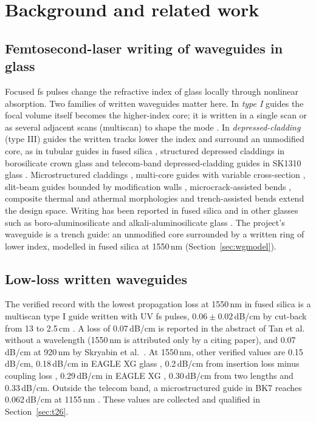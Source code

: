 \documentclass[11pt,a4paper]{article}
\newcommand{\dBcm}{\,dB/cm\xspace}
\begin{document}
\section{Background and related work}
\label{sec:background}

\subsection{Femtosecond-laser writing of waveguides in glass}

Focused fs pulses change the refractive index of glass locally through nonlinear absorption. Two families of written waveguides matter here. In \emph{type I} guides the focal volume itself becomes the higher-index core; it is written in a single scan or as several adjacent scans (multiscan) to shape the mode \cite{Tan2021,Tan2022,Skryabin2024,Ackermann2025,Memeo2026}. In \emph{depressed-cladding} (type III) guides the written tracks lower the index and surround an unmodified core, as in tubular guides in fused silica \cite{Bukharin2015}, structured depressed claddings in borosilicate crown glass \cite{Likhov2025} and telecom-band depressed-cladding guides in SK1310 glass \cite{Zhou2025}. Microstructured claddings \cite{Chen2018}, multi-core guides with variable cross-section \cite{Sun2022}, slit-beam guides bounded by modification walls \cite{Liu2018}, microcrack-assisted bends \cite{Lee2021}, composite thermal and athermal morphologies \cite{RossAdams2024} and trench-assisted bends \cite{Yu2026} extend the design space. Writing has been reported in fused silica and in other glasses such as boro-aluminosilicate \cite{Ceccarelli2020,RossAdams2024} and alkali-aluminosilicate glass \cite{Lapointe2014}. The project's waveguide is a trench guide: an unmodified core surrounded by a written ring of lower index, modelled in fused silica at 1550\,nm (Section~\ref{sec:wgmodel}).

\subsection{Low-loss written waveguides}

The verified record with the lowest propagation loss at 1550\,nm in fused silica is a multiscan type I guide written with UV fs pulses, $0.06\pm0.02$\dBcm by cut-back from 13 to 2.5\,cm \cite{Ackermann2025}. A loss of 0.07\dBcm is reported in the abstract of Tan et al.\ \cite{Tan2022} without a wavelength (1550\,nm is attributed only by a citing paper), and 0.07\dBcm at 920\,nm by Skryabin et al.\ \cite{Skryabin2024}. At 1550\,nm, other verified values are 0.15\dBcm \cite{Lee2021}, 0.18\dBcm in EAGLE XG glass \cite{RossAdams2024}, 0.2\dBcm from insertion loss minus coupling loss \cite{Djogo2026}, 0.29\dBcm in EAGLE XG \cite{Ceccarelli2020}, 0.30\dBcm from two lengths \cite{Djogo2019} and 0.33\dBcm \cite{Memeo2026}. Outside the telecom band, a microstructured guide in BK7 reaches 0.062\dBcm at 1155\,nm \cite{Chen2018}. These values are collected and qualified in Section~\ref{sec:t26}.
\end{document}
